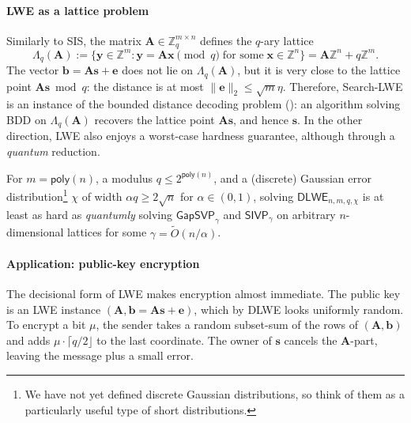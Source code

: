 \documentclass[../../book.tex]{subfiles}
\begin{document}
\paragraph{LWE as a lattice problem}
Similarly to SIS, the matrix $\mathbf{A} \in \mathbb{Z}_q^{m \times n}$ defines the $q$-ary lattice
\begin{equation*}
    \Lambda_q(\mathbf{A}) := \{\mathbf{y} \in \mathbb{Z}^m: \mathbf{y} = \mathbf{A}\mathbf{x} \pmod{q} \; \text{for some} \; \mathbf{x} \in \mathbb{Z}^n\} = \mathbf{A}\mathbb{Z}^n + q\mathbb{Z}^m.
\end{equation*}
The vector $\mathbf{b} = \mathbf{A}\mathbf{s}+\mathbf{e}$ does not lie on $\Lambda_q(\mathbf{A})$, but it is very close to the lattice point $\mathbf{A}\mathbf{s} \bmod q$: the distance is at most $\|\mathbf{e}\|_2 \leq \sqrt{m}\eta$.
Therefore, Search-LWE is an instance of the bounded distance decoding problem (): an algorithm solving BDD on $\Lambda_q(\mathbf{A})$ recovers the lattice point $\mathbf{A}\mathbf{s}$, and hence $\mathbf{s}$.
In the other direction, LWE also enjoys a worst-case hardness guarantee, although through a \emph{quantum} reduction.

\begin{theorem}\label{thm:lwe-worst-case}
    For $m = \mathsf{poly}(n)$, a modulus $q \leq 2^{\mathsf{poly}(n)}$, and a (discrete) Gaussian error distribution\footnote{We have not yet defined discrete Gaussian distributions, so think of them as a particularly useful type of short distributions.} $\chi$ of width $\alpha q \geq 2\sqrt{n}$ for $\alpha \in (0,1)$, solving $\mathsf{DLWE}_{n,m,q,\chi}$ is at least as hard as \emph{quantumly} solving $\mathsf{GapSVP}_{\gamma}$ and $\mathsf{SIVP}_{\gamma}$ on arbitrary $n$-dimensional lattices for some $\gamma = \widetilde{O}(n/\alpha)$.
\end{theorem}

\paragraph{Application: public-key encryption}
The decisional form of LWE makes encryption almost immediate.
The public key is an LWE instance $(\mathbf{A},\mathbf{b} = \mathbf{A}\mathbf{s}+\mathbf{e})$, which by DLWE looks uniformly random.
To encrypt a bit $\mu$, the sender takes a random subset-sum of the rows of $(\mathbf{A},\mathbf{b})$ and adds $\mu \cdot \lceil q/2 \rfloor$ to the last coordinate.
The owner of $\mathbf{s}$ cancels the $\mathbf{A}$-part, leaving the message plus a small error.
\end{document}
